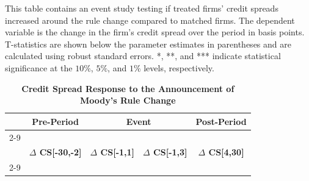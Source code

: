\documentclass[a4paper, 12pt]{article}
\begin{document}
\begin{landscape}
\pagestyle{empty}
\begin{table}[htbp]
\caption{\textbf{Credit Spread Response to the Announcement of Moody's Rule Change}
} \label{table_spreadsm}
\begin{singlespace}
\begin{small}

\noindent This table contains an event study testing if treated firms' credit spreads increased around the rule change compared to matched firms. The dependent variable is the change in the firm's credit spread over the period in basis points. T-statistics are shown below the parameter estimates in parentheses and are calculated using robust standard errors. *, **, and *** indicate statistical significance at the $10\%$, $5\%$, and $1\%$ levels, respectively.

\end{small}
\end{singlespace}
\vspace{3mm}
\small
  \centering

\begin{tabular}{lcccccccc}
\\
    \toprule
        &
        \multicolumn{2}{c}{\textbf{Pre-Period}} &
      \multicolumn{4}{c}{\textbf{Event}} &
        \multicolumn{2}{c}{\textbf{Post-Period}}
        \\
                  \cline{2-9}
        \\
    &
    \multicolumn{2}{c}{\textbf{$\Delta$ CS[-30,-2]}} &
      \multicolumn{2}{c}{\textbf{$\Delta$ CS[-1,1]}} &
        \multicolumn{2}{c}{\textbf{$\Delta$ CS[-1,3]}} &
           \multicolumn{2}{c}{\textbf{$\Delta$ CS[4,30]}}
      \\
          \cline{2-9}

    \bottomrule
    \end{tabular}


\end{table}
\end{landscape}
\clearpage
\newpage
\end{document}
